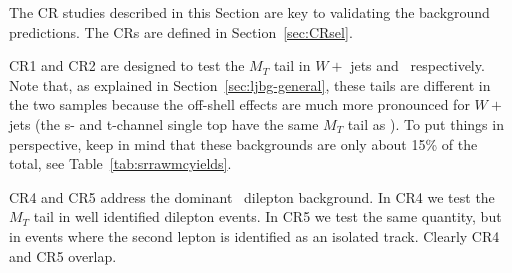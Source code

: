 The CR studies described in this Section are key to validating the
background predictions.  The CRs are defined in Section~\ref{sec:CRsel}.

CR1 and CR2 are designed to test the $M_T$ tail in $W +$ jets and 
\ttbar\ respectively.  Note that, as explained in Section~\ref{sec:ljbg-general},
these tails are different in the two samples because the off-shell effects
are much more pronounced for $W +$ jets (the s- and t-channel single 
top have the same $M_T$ tail as \ttbar).  To put things in perspective, 
keep in mind that these
backgrounds are only about 15\% of the total, see Table~\ref{tab:srrawmcyields}.

CR4 and CR5 address the dominant \ttbar\ dilepton background.
In CR4 we test the $M_T$ tail in well identified dilepton events.
In CR5 we test the same quantity, but in events where the second lepton is identified
as an isolated track.  Clearly CR4 and CR5 overlap.
